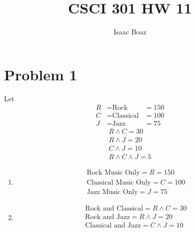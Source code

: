 \documentclass{article}
\title{\vspace{-5ex}CSCI 301 HW 11}
\author{Isaac Boaz}
\begin{document}
\maketitle

\section*{Problem 1}
Let
\begin{align*}
   R &= \text{Rock} & = 150 \\
   C &= \text{Classical} & = 100 \\
   J &= \text{Jazz} & = 75
\end{align*}
\begin{align*}
    R \wedge C = 30 \\
    R \wedge J = 20 \\
    C \wedge J = 10 \\
    R \wedge C \wedge J = 5
\end{align*}

\begin{enumerate}[label=\alph*]
    \item \begin{align*}
        \text{Rock Music Only} = R = 150 \\
        \text{Classical Music Only} = C = 100 \\
        \text{Jazz Music Only} = J = 75
    \end{align*}
    \item \begin{align*}
        \text{Rock and Classical} = R \wedge C = 30 \\
        \text{Rock and Jazz} = R \wedge J = 20 \\
        \text{Classical and Jazz} = C \wedge J = 10 \\
    \end{align*}
\end{enumerate}

\pagebreak
\end{document}

